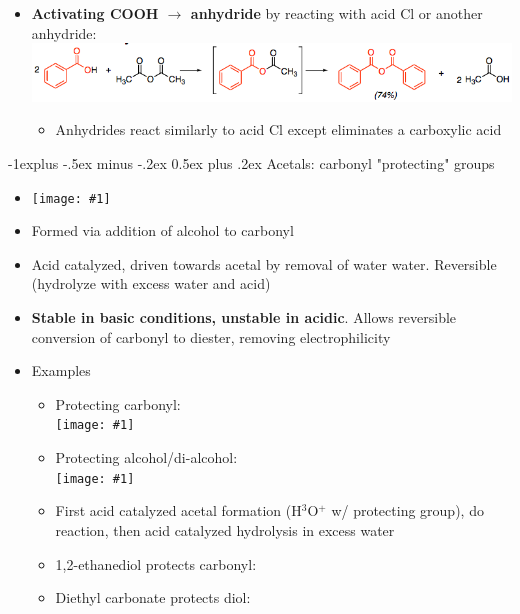 \documentclass[10pt,landscape]{article}
\makeatletter
\renewcommand{\subsection}{\@startsection{subsection}{2}{0mm}%
  {-1explus -.5ex minus -.2ex}%
  {0.5ex plus .2ex}%
  {\normalfont\normalsize\bfseries}}
\newcommand{\img}[1]{\texttt{[image: \#1]}}
\makeatother
\begin{document}
\begin{multicols*}{3}
\begin{scriptsize}
\begin{itemize}
\begin{itemize}
      \end{itemize}
    \item \textbf{Activating COOH $\rightarrow$ anhydride} by reacting with acid Cl or
      another anhydride:\\
      \includegraphics[scale=0.28]{forminganhydride.png}
      \begin{itemize}
      \item Anhydrides react similarly to acid Cl except eliminates a carboxylic acid
      \end{itemize}
    \end{itemize}
    
    \subsection{Acetals: carbonyl "protecting" groups}

    \begin{itemize}
    \item[] \img{acetal1.png}
    \item Formed via addition of alcohol to carbonyl
    \item Acid catalyzed, driven towards acetal by removal of water water. Reversible
      (hydrolyze with excess water and acid)
    \item \textbf{Stable in basic conditions, unstable in acidic}. Allows reversible
      conversion of carbonyl to diester, removing electrophilicity
    \item Examples
      \begin{itemize}
      \item Protecting carbonyl:\\
        \img{pr-cnyl.png}
      \item Protecting alcohol/di-alcohol:\\
        \img{pr-ol.png}
      \item First acid catalyzed acetal formation (H$^3$O$^+$ w/ protecting group), do
        reaction, then acid catalyzed hydrolysis in excess water
      \item 1,2-ethanediol protects carbonyl:
      \item Diethyl carbonate protects diol:
      \end{itemize}
    \end{itemize}


\end{scriptsize}
\end{multicols*}
\end{document}
